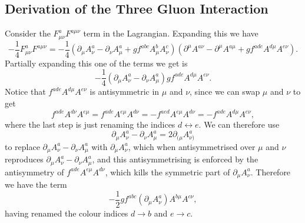 \documentclass[fleqn]{NotesClass}
\begin{document}
    \subsection{Derivation of the Three Gluon Interaction}
    Consider the \(F^a_{\mu\nu}F^{a\mu\nu}\) term in the Lagrangian.
    Expanding this we have
    \begin{equation}
        -\frac{1}{4}F^a_{\mu\nu}F^{a\mu\nu} = -\frac{1}{4}(\partial_\mu A^a_\nu - \partial_\nu A^a_\mu + gf^{abc}A^b_\mu A^c_\nu)(\partial^\mu A^{a\nu} - \partial^\mu A^{a\mu} + gf^{ade}A^{d\mu}A^{e\nu}).
    \end{equation}
    Partially expanding this one of the terms we get is
    \begin{equation}
        -\frac{1}{4}(\partial_\mu A^a_\nu - \partial_\nu A^a_\mu)gf^{ade}A^{d\mu}A^{e\nu}.
    \end{equation}
    Notice that \(f^{ade}A^{d\mu}A^{e\nu}\) is antisymmetric in \(\mu\) and \(\nu\), since we can swap \(\mu\) and \(\nu\) to get
    \begin{equation}
        f^{ade}A^{d\nu}A^{e\mu} = f^{ade}A^{e\mu}A^{d\nu} = -f^{aed}A^{e\mu}A^{d\nu} = -f^{ade}A^{d\mu}A^{e\nu},
    \end{equation}
    where the last step is just renaming the indices \(d \leftrightarrow e\).
    We can therefore use
    \begin{equation}
        \partial_\mu A^a_\nu - \partial_\nu A^a_\mu = 2 \partial_{(\mu} A^a_{\nu)}
    \end{equation}
    to replace \(\partial_\mu A^a_\nu - \partial_\nu A^a_\mu\) with \(\partial_\mu A^a_\nu\), which when antisymmetrised over \(\mu\) and \(\nu\) reproduces \(\partial_\mu A^a_\nu - \partial_\nu A^a_\mu\), and this antisymmetrising is enforced by the antisymmetry of \(f^{ade}A^{e\mu}A^{d\nu}\), which kills the symmetric part of \(\partial_\mu A^a_\nu\).
    Therefore we have the term
    \begin{equation}
        -\frac{1}{2} g f^{abc} (\partial_\mu A^a_\nu)A^{b\mu}A^{c\nu},
    \end{equation}
    having renamed the colour indices \(d \to b\) and \(e \to c\).
    
\end{document}
